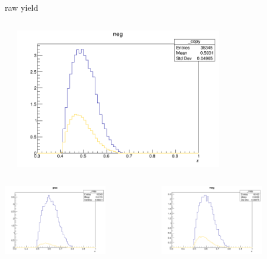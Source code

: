 \begin{frame}{raw yield}
\begin{columns}
\begin{column}[T]{0.25\textwidth}
\end{column}
\begin{column}[T]{0.25\textwidth}
\includegraphics[width = 0.7\textwidth]{results/yield/statistics/yield_x_Q2_z_0.65_5.500_0.50_neg.png}
\end{column}
\end{columns}
\begin{columns}
\begin{column}[T]{0.25\textwidth}
\includegraphics[width = 0.7\textwidth]{results/yield/statistics/yield_x_Q2_z_0.65_5.500_0.60_pos.png}
\end{column}
\begin{column}[T]{0.25\textwidth}
\includegraphics[width = 0.7\textwidth]{results/yield/statistics/yield_x_Q2_z_0.65_5.500_0.60_neg.png}

\end{column}
\end{columns}
\end{frame}
